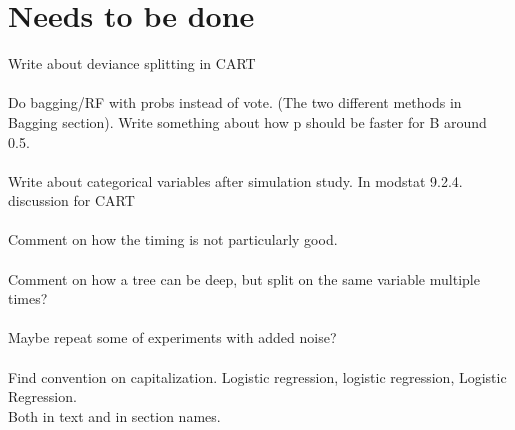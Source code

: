 \clearpage
\section{Needs to be done}
\label{sec:Needs to be done}
Write about deviance splitting in CART\\
\\
Do bagging/RF with probs instead of vote. (The two different methods in Bagging section). Write something about how p should be faster for B around 0.5.\\
\\
Write about categorical variables after simulation study. In modstat 9.2.4. discussion for CART\\
\\
Comment on how the timing is not particularly good. \\
\\
Comment on how a tree can be deep, but split on the same variable multiple times?\\
\\
Maybe repeat some of experiments with added noise?\\
\\
Find convention on capitalization. Logistic regression, logistic regression, Logistic Regression. \\
Both in text and in section names.\\
\\


